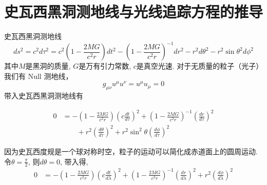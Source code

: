 \section{史瓦西黑洞测地线与光线追踪方程的推导}

史瓦西黑洞测地线
\begin{equation}
    ds^{2}=c^{2}d\tau^{2}=c^{2}\left(1-\frac{2MG}{c^{2}r}\right)dt^{2}-\left(1-\frac{2MG}{c^{2}r}\right)^{-1}dr^{2}-r^{2}d\theta^{2}-r^{2}\sin\theta^{2}d\phi^{2}
\end{equation}
其中$M$是黑洞的质量, $G$是万有引力常数, $c$是真空光速.
对于无质量的粒子（光子）我们有 Null 测地线，
\begin{equation}
    g_{\mu\nu}u^{\mu}u^{\nu}=u^{\mu}u_{\mu}=0
\end{equation}
带入史瓦西黑洞测地线有

\begin{equation}
    \begin{split}
        0 & =-\left(1-\frac{2MG}{c^{2}r}\right)\left(c\frac{dt}{d\tau}\right)^{2}+\left(1-\frac{2MG}{c^{2}r}\right)^{-1}\left(\frac{dr}{d\tau}\right)^{2}\\
        & \qquad+r^{2}\left(\frac{d\theta}{d\tau}\right)^{2}+r^{2}\sin^{2}\theta\left(\frac{d\phi}{d\tau}\right)^{2}
    \end{split}
\end{equation}

因为史瓦西度规是一个球对称时空，粒子的运动可以简化成赤道面上的圆周运动. 令$\theta=\frac{\pi}{2}$, 则$d\theta=0$, 带入得,
\begin{equation}
    \begin{split}
        0&=-\left(1-\frac{2MG}{c^{2}r}\right)\left(c\frac{dt}{d\lambda}\right)^{2}+\left(1-\frac{2MG}{c^{2}r}\right)^{-1}\left(\frac{dr}{d\lambda}\right)^{2}+r^{2}\left(\frac{d\phi}{d\lambda}\right)^{2}
    \end{split}
\end{equation}

